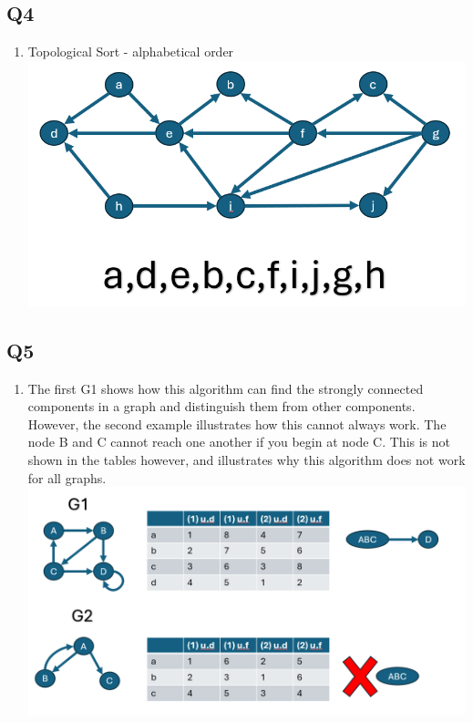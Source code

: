 \documentclass{article}
\begin{document}
\subsection*{Q4}
\begin{enumerate}[label=(\alph*)]
    \item Topological Sort - alphabetical order
    \subitem \includegraphics[width=.75\textwidth]{dfs.png}
\end{enumerate}

\subsection*{Q5}
\begin{enumerate}[label=(\alph*)]
    \item The first G1 shows how this algorithm can find the strongly connected components in a graph and distinguish them from other components. However, the second example illustrates how this cannot always work. The node B and C cannot reach one another if you begin at node C. This is not shown in the tables however, and illustrates why this algorithm does not work for all graphs.
    \subitem \includegraphics[width=.75\textwidth]{sssc.png}
\end{enumerate}

\end{document}
